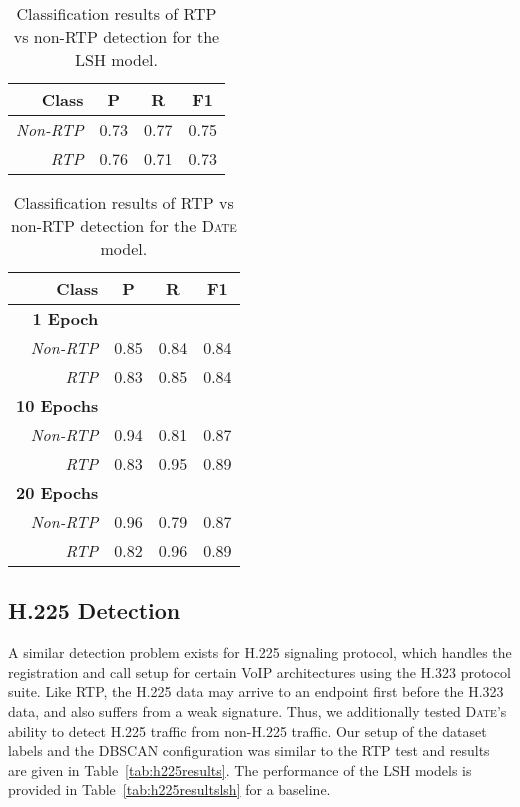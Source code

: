 \begin{table} [h!]
\centering
\begin{tabular}{| r | c | c | c |}
\hline
Class & P & R & F1 \\
\hline
\textit{Non-RTP} & 0.73 & 0.77 & 0.75 \\
\textit{RTP} & 0.76 & 0.71 & 0.73 \\
\hline
\end{tabular}
\caption{Classification results of RTP vs non-RTP detection for the LSH model.}
\label{tab:rtpresultslsh}
\end{table}

\begin{table} [h!]
\centering
\begin{tabular}{| r | c | c | c |}
\hline
Class & P & R & F1 \\
\hline
\textbf{1 Epoch} &&& \\
\textit{Non-RTP} & 0.85 & 0.84 & 0.84 \\
\textit{RTP} & 0.83 & 0.85 & 0.84 \\
\hline
\textbf{10 Epochs} &&& \\
\textit{Non-RTP} & 0.94 & 0.81 & 0.87 \\
\textit{RTP} & 0.83 & 0.95 & 0.89 \\
\hline
\textbf{20 Epochs} &&& \\
\textit{Non-RTP} & 0.96 & 0.79 & 0.87 \\
\textit{RTP} & 0.82 & 0.96 & 0.89 \\
\hline
\end{tabular}
\caption{Classification results of RTP vs non-RTP detection for the \textsc{Date} model.}
\label{tab:rtpresults}
\end{table}

\subsection{H.225 Detection}
A similar detection problem exists for H.225 signaling protocol, which handles the registration and call setup for certain VoIP architectures using the H.323 protocol suite. Like RTP, the H.225 data may arrive to an endpoint first before the H.323 data, and also suffers from a weak signature. Thus, we additionally tested \textsc{Date}'s ability to detect H.225 traffic from non-H.225 traffic. Our setup of the dataset labels and the DBSCAN configuration was similar to the RTP test and results are given in Table~\ref{tab:h225results}. The performance of the LSH models is provided in Table~\ref{tab:h225resultslsh} for a baseline.

